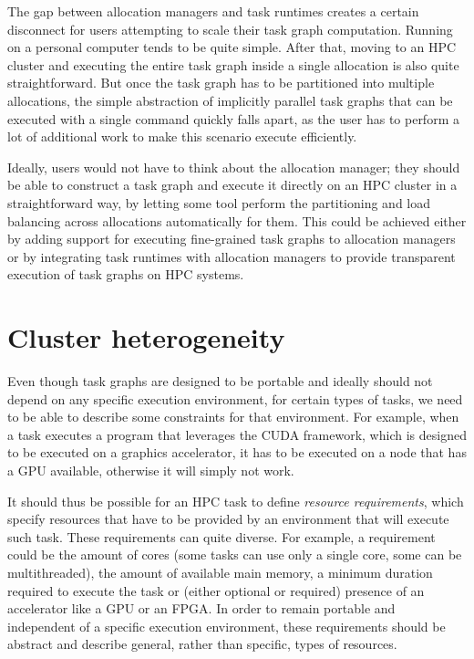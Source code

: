 \vspace{5mm}
The gap between allocation managers and task runtimes creates a certain disconnect for users
attempting to scale their task graph computation. Running on a personal computer tends to be quite
simple. After that, moving to an HPC cluster and executing the entire task graph inside a single
allocation is also quite straightforward. But once the task graph has to be partitioned into
multiple allocations, the simple abstraction of implicitly parallel task graphs that can be
executed with a single command quickly falls apart, as the user has to perform a lot of additional
work to make this scenario execute efficiently.

Ideally, users would not have to think about the allocation manager; they should be able to
construct a task graph and execute it directly on an HPC cluster in a straightforward way, by
letting some tool perform the partitioning and load balancing across allocations automatically for
them. This could be achieved either by adding support for executing fine-grained task graphs to
allocation managers or by integrating task runtimes with allocation managers to provide transparent
execution of task graphs on HPC systems.

\section{Cluster heterogeneity}
Even though task graphs are designed to be portable and ideally should not depend on any specific
execution environment, for certain types of tasks, we need to be able to describe some constraints
for that environment. For example, when a task executes a program that leverages the
CUDA framework, which is designed to be executed on a graphics
accelerator, it has to be executed on a node that has a GPU available, otherwise it will simply not
work.

It should thus be possible for an HPC task to define \emph{resource requirements}, which specify
resources that have to be provided by an environment that will execute such task. These
requirements can quite diverse. For example, a requirement could be the amount of cores (some tasks
can use only a single core, some can be multithreaded), the amount of available main memory, a
minimum duration required to execute the task or (either optional or required) presence of an
accelerator like a GPU or an FPGA\@. In order to remain portable and independent of a specific
execution environment, these requirements should be abstract and describe general, rather than
specific, types of resources.

